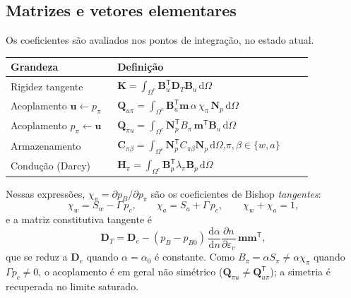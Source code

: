 \documentclass[11pt,a4paper]{article}
\numberwithin{equation}{section}
\newcommand{\dd}{\mathrm{d}}
\begin{document}
\subsection{Matrizes e vetores elementares}

Os coeficientes são avaliados nos pontos de integração, no estado atual.
\begin{center}
\renewcommand{\arraystretch}{1.6}
\begin{tabular}{p{0.30\linewidth}p{0.55\linewidth}}
\toprule
Grandeza & Definição\\
\midrule
Rigidez tangente &
$\mathbf K=\displaystyle\int_{\Omega^e}\mathbf B_u^{\mathsf T}\mathbf D_T\mathbf B_u\,\dd\Omega$\\
Acoplamento $\mathbf u\leftarrow p_\pi$ &
$\mathbf Q_{u\pi}=\displaystyle\int_{\Omega^e}\mathbf B_u^{\mathsf T}\mathbf m\,\alpha\,\chi_\pi\,\mathbf N_p\,\dd\Omega$\\
Acoplamento $p_\pi\leftarrow\mathbf u$ &
$\mathbf Q_{\pi u}=\displaystyle\int_{\Omega^e}\mathbf N_p^{\mathsf T}B_\pi\,\mathbf m^{\mathsf T}\mathbf B_u\,\dd\Omega$\\
Armazenamento &
$\mathbf C_{\pi\beta}=\displaystyle\int_{\Omega^e}\mathbf N_p^{\mathsf T}C_{\pi\beta}\mathbf N_p\,\dd\Omega$,\quad $\pi,\beta\in\{w,a\}$\\
Condução (Darcy) &
$\mathbf H_\pi=\displaystyle\int_{\Omega^e}\mathbf B_p^{\mathsf T}\lambda_\pi\mathbf B_p\,\dd\Omega$\\
\bottomrule
\end{tabular}
\end{center}

Nessas expressões, $\chi_\pi=\partial p_B/\partial p_\pi$ são os
coeficientes de Bishop \emph{tangentes}:
\begin{equation}
\boxed{\chi_w=S_w-\Gamma\,p_c,\qquad \chi_a=S_a+\Gamma\,p_c,\qquad \chi_w+\chi_a=1,}
\end{equation}
e a matriz constitutiva tangente é
\begin{equation}
\mathbf D_T=\mathbf D_e-(p_B-p_{B0})\,\frac{\dd\alpha}{\dd n}\frac{\partial n}{\partial\varepsilon_v}\,\mathbf m\mathbf m^{\mathsf T},
\end{equation}
que se reduz a $\mathbf D_e$ quando $\alpha=\alpha_0$ é constante.
Como $B_\pi=\alpha S_\pi\neq\alpha\chi_\pi$ quando $\Gamma p_c\neq0$,
o acoplamento é em geral não simétrico ($\mathbf Q_{\pi u}\neq\mathbf Q_{u\pi}^{\mathsf T}$);
a simetria é recuperada no limite saturado.
\end{document}
